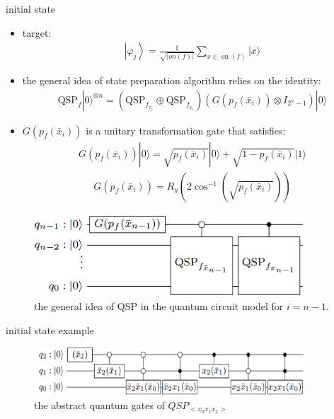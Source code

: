 \begin{frame}{initial state }
    \begin{itemize}
      \item target:
      \begin{align}
        \left|\varphi_{j}\right\rangle= \frac{1}{\sqrt{|on(f)|}} \sum_{x \in \operatorname{on}(f)}|x\rangle
      \end{align}
      \item the  general  idea  of  state  preparation  algorithm  relies on the identity:
      \begin{align}
        \mathrm{QSP}_{f}|0\rangle^{\otimes n} = \left(\mathrm{QSP}_{f_{\bar{x}_{i}}} \oplus \mathrm{QSP}_{f_{x_{i}}}\right)\left(G\left(p_{f}\left(\bar{x}_{i}\right)\right) \otimes I_{2^{n}-1}\right)|0\rangle
      \end{align}
      \item $G\left(p_{f}\left(\bar{x}_{i}\right)\right)$ is a unitary transformation gate that satisfies:
      \begin{align}
        G(p_{f}\left(\bar{x}_{i}\right))|0\rangle = \sqrt{p_{f}\left(\bar{x}_{i}\right)}|0\rangle+\sqrt{1-p_{f}\left(\bar{x}_{i}\right)}|1\rangle
      \end{align}
      \begin{align}
        G\left(p_{f}\left(\bar{x}_{i}\right)\right) = R_{y}\left(2 \cos ^{-1}\left(\sqrt{p_{f}\left(\bar{x}_{i}\right)}\right)\right)
      \end{align}
    \end{itemize}
  \end{frame}
  \begin{frame}
    \begin{figure}[htbq]
      \centering
      \includegraphics[width=0.9\textwidth]{figure/QSP.png}
      \caption{the general idea of QSP in the quantum  circuit  model for $i=n-1$.} 
      \label{fig-qsp}
    \end{figure}
  \end{frame}
  \begin{frame}{initial state example}
    \begin{figure}[htbq]
      \centering
      \includegraphics[width=0.9\textwidth]{figure/qsp_example.png}
      \caption{the abstract quantum gates of $QSP_{<x_0x_1x_2>}$} 
      \label{fig-qsp-example}
    \end{figure}
  \end{frame}
